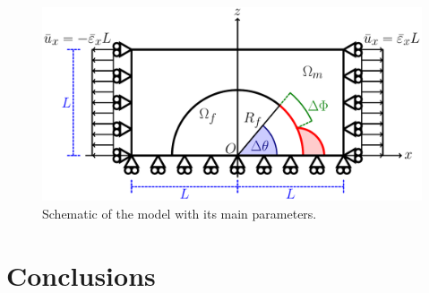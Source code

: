 \begin{figure}[!htb]
\centering
  \includegraphics[height=0.225\textheight]{paperD/RUC.pdf}
\caption{Schematic of the model with its main parameters.}\label{paperD:fig:ruc}
\end{figure}

\section{Conclusions}

